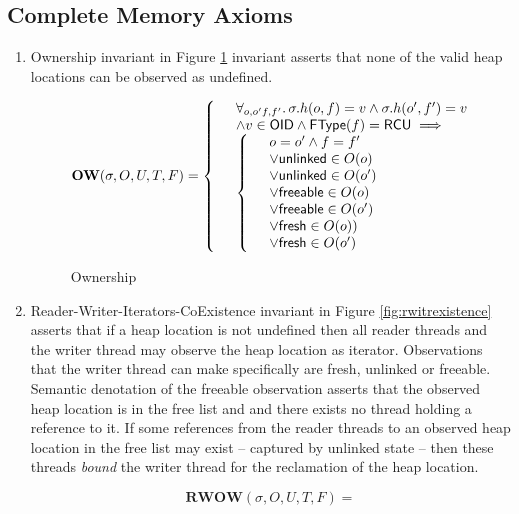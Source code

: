 \subsection{Complete Memory Axioms}
\label{sec:memaxioms}
\begin{enumerate}
\item{Ownership} invariant in Figure \ref{fig:ownership} invariant asserts that none of the valid heap locations can be observed as undefined.
\begin{figure}[!htb]
\[
\textbf{OW}(\sigma,O,U,T,F) =
\left\{
\begin{array}{ll}
 	 & \forall_{o,o'f,f'} \ldotp  \sigma.h(o,f) = v \land \sigma.h(o',f') = v \\
	& \land v \in \textsf{OID}  \land  \textsf{FType}(f) = \textsf{RCU} \implies \\
 	&\left\{
		\begin{array}{cl}
			&  o=o' \land f=f' \\
			& \lor\textsf{unlinked} \in O(o) \\
		  & \lor \textsf{unlinked} \in O(o') \\
                  & \lor \textsf{freeable} \in O(o)\\
                  & \lor \textsf{freeable} \in O(o')\\
		        & \lor \textsf{fresh} \in O(o)) \\
                        & \lor \textsf{fresh} \in O(o')
		\end{array}
		\right.%
\end{array}
\right.%
\]
\caption{Ownership}
\label{fig:ownership}
\end{figure}
\item{Reader-Writer-Iterators-CoExistence} invariant in Figure \ref{fig:rwitrexistence} asserts that  if a heap location is not undefined then all reader threads and the writer thread may observe the heap location as \textsf{iterator}. Observations that the writer thread can make specifically are \textsf{fresh}, \textsf{unlinked} or \textsf{freeable}. Semantic denotation of the \textsf{freeable} observation asserts that the observed heap location is in the free list and and there exists no thread holding a reference to it. If some references from the reader threads to an observed heap location in the free list may exist -- captured by \textsf{unlinked} state -- then these threads \textit{bound} the writer thread for the reclamation of the heap location.
\begin{figure}[!htb]
\[
\textbf{RWOW}(\sigma,O,U,T,F)=
\]
\end{figure}
\end{enumerate}
